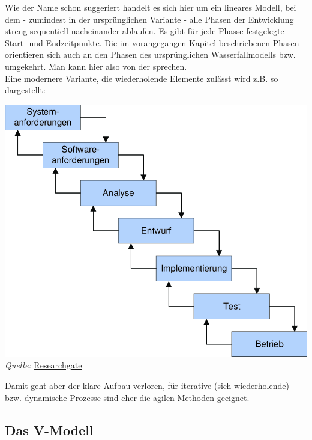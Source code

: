 \documentclass{article}
\begin{document}
Wie der Name schon suggeriert handelt es sich hier um ein lineares Modell, bei dem - zumindest in der ursprünglichen Variante - alle Phasen der Entwicklung streng sequentiell nacheinander ablaufen. Es gibt für jede Phasse festgelegte Start- und Endzeitpunkte. Die im vorangegangen Kapitel beschriebenen Phasen orientieren sich auch an den Phasen des ursprünglichen Wasserfallmodells bzw. umgekehrt. Man kann hier also von der  sprechen. \\
Eine modernere Variante, die wiederholende Elemente zulässt wird z.B. so dargestellt: 
\begin{center}
    \includegraphics[scale=0.35]{../media/wasserfallmodell.png} \\
    \textit{Quelle:} \href{https://www.researchgate.net/figure/Abbildung-21-Das-Wasserfallmodell_fig1_228914046}{Researchgate}
\end{center}
Damit geht aber der klare Aufbau verloren, für iterative (sich wiederholende) bzw. dynamische Prozesse sind eher die agilen Methoden geeignet.

\subsection{Das V-Modell}
\end{document}
